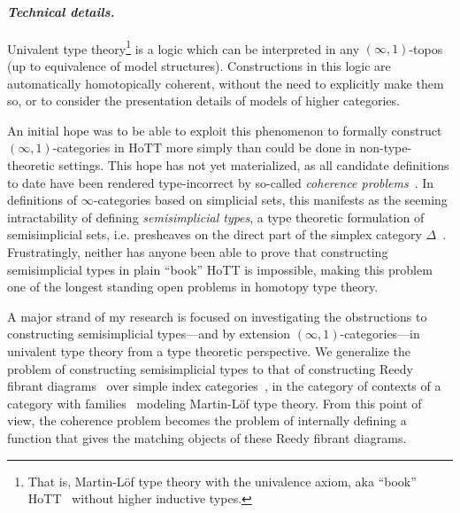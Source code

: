 \documentclass[a4paper]{article}
\begin{document}
\paragraph{\normalfont\textit{Technical details.}} Univalent type theory\footnote{That is, Martin-L\"{o}f type theory with the univalence axiom, aka ``book'' HoTT~\cite{hott-book} without higher inductive types.} is a logic which can be interpreted in any $(\infty, 1)$-topos~\cite{shulman:19:strict-univalent-universes} (up to equivalence of model structures).
Constructions in this logic are automatically homotopically coherent, without the need to explicitly make them so, or to consider the presentation details of models of higher categories.

An initial hope was to be able to exploit this phenomenon to formally construct $(\infty, 1)$-categories in HoTT more simply than could be done in non-type-theoretic settings.
This hope has not yet materialized, as all candidate definitions to date have been rendered type-incorrect by so-called \emph{coherence problems}~\cite{buchholtz:22:update}.
In definitions of $\infty$-categories based on simplicial sets, this manifests as the seeming intractability of defining \emph{semisimplicial types}, a type theoretic formulation of semisimplicial sets, i.e. presheaves on the direct part of the simplex category $\Delta$~\cite{nlab:23:semi-simplicial-types}.
Frustratingly, neither has anyone been able to prove that constructing semisimplicial types in plain ``book'' HoTT is impossible, making this problem one of the longest standing open problems in homotopy type theory.

A major strand of my research is focused on investigating the obstructions to constructing semisimplicial types---and by extension $(\infty, 1)$-categories---in univalent type theory from a type theoretic perspective.
We generalize the problem of constructing semisimplicial types to that of constructing Reedy fibrant diagrams~\cite{riehl:14:cat-homotopy-theory,riehl-verity:14:tap-reedy-categories} over simple index categories~\cite{makkai:95:folds}, in the category of contexts of a category with families~\cite{dybjer:96:internal-tt} modeling Martin-L\"{o}f type theory.
From this point of view, the coherence problem becomes the problem of internally defining a function that gives the matching objects of these Reedy fibrant diagrams.
\end{document}
